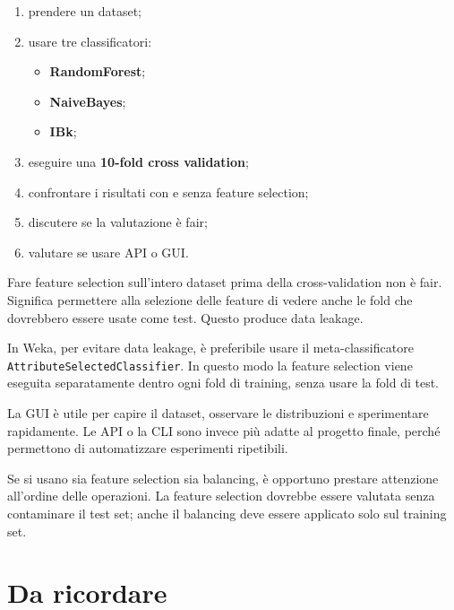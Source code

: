 \begin{enumerate}
    \item prendere un dataset;
    \item usare tre classificatori:
    \begin{itemize}
        \item \textbf{RandomForest};
        \item \textbf{NaiveBayes};
        \item \textbf{IBk};
    \end{itemize}
    \item eseguire una \textbf{10-fold cross validation};
    \item confrontare i risultati con e senza feature selection;
    \item discutere se la valutazione è fair;
    \item valutare se usare API o GUI.
\end{enumerate}

\begin{notaesame}
Fare feature selection sull'intero dataset prima della cross-validation non è fair. Significa permettere alla selezione delle feature di vedere anche le fold che dovrebbero essere usate come test. Questo produce data leakage.
\end{notaesame}

\begin{notaprof}
In Weka, per evitare data leakage, è preferibile usare il meta-classificatore \texttt{AttributeSelectedClassifier}. In questo modo la feature selection viene eseguita separatamente dentro ogni fold di training, senza usare la fold di test.
\end{notaprof}

\begin{notaprof}
La GUI è utile per capire il dataset, osservare le distribuzioni e sperimentare rapidamente. Le API o la CLI sono invece più adatte al progetto finale, perché permettono di automatizzare esperimenti ripetibili.
\end{notaprof}

\begin{notaprof}
Se si usano sia feature selection sia balancing, è opportuno prestare attenzione all'ordine delle operazioni. La feature selection dovrebbe essere valutata senza contaminare il test set; anche il balancing deve essere applicato solo sul training set.
\end{notaprof}

\section{Da ricordare}

